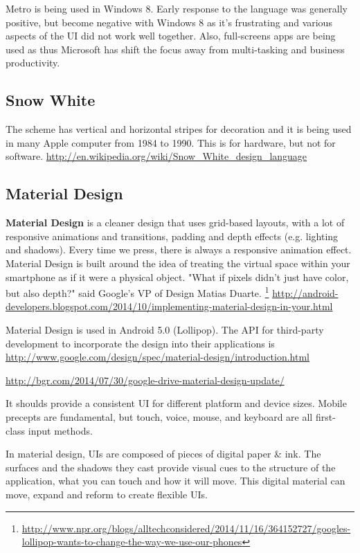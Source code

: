 Metro is being used in Windows 8. Early response to the language was generally
positive, but become negative with Windows 8 as it's frustrating and various
aspects of the UI did not work well together. Also, full-screens apps are being
used as thus Microsoft has shift the focus away from multi-tasking and business
productivity.

\subsection{Snow White}
\label{sec:SnowWhite}

The scheme has vertical and horizontal stripes for decoration and it is being
used in many Apple computer from 1984 to 1990. This is for hardware, but not for
software.
\url{http://en.wikipedia.org/wiki/Snow_White_design_language}

\subsection{Material Design}
\label{sec:MaterialDesign}

{\bf Material Design} is a cleaner design that uses grid-based layouts,
with a lot of responsive animations and transitions, padding and depth effects
(e.g. lighting and shadows). Every time we press, there is always a responsive
animation effect. Material Design is built around the idea of
treating the virtual space within your smartphone as if it were a physical object. "What if pixels
didn't just have color, but also depth?" said Google's VP of Design Matias
Duarte.
\footnote{\url{http://www.npr.org/blogs/alltechconsidered/2014/11/16/364152727/googles-lollipop-wants-to-change-the-way-we-use-our-phones}}
\url{http://android-developers.blogspot.com/2014/10/implementing-material-design-in-your.html}

Material Design is used in Android 5.0 (Lollipop). The API for third-party
development to incorporate the design into their applications is 
\url{http://www.google.com/design/spec/material-design/introduction.html}

\url{http://bgr.com/2014/07/30/google-drive-material-design-update/}

It shoulds provide a consistent UI for different platform and device sizes. 
Mobile precepts are fundamental, but touch, voice, mouse, and keyboard are all
first-class input methods.

In material design, UIs are composed of pieces of digital paper \& ink. 
The surfaces and the shadows they cast provide visual cues to the structure of
the application, what you can touch and how it will move. This digital material can move, expand and reform to create flexible UIs.

